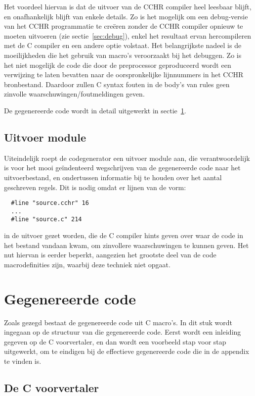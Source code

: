 Het voordeel hiervan is dat de uitvoer van de CCHR compiler heel leesbaar blijft, en onafhankelijk blijft van enkele details. Zo is het mogelijk om een debug-versie van het CCHR programmatie te cre\"eren zonder de CCHR compiler opnieuw te moeten uitvoeren (zie sectie~\ref{sec:debug}), enkel het resultaat ervan hercompileren met de C compiler en een andere optie volstaat. Het belangrijkste nadeel is de moeilijkheden die het gebruik van macro's veroorzaakt bij het debuggen. Zo is het niet mogelijk de code die door de preprocessor geproduceerd wordt een verwijzing te laten bevatten naar de oorspronkelijke lijnnummers in het CCHR bronbestand. Daardoor zullen C syntax fouten in de body's van rules geen zinvolle waarschuwingen/foutmeldingen geven.

De gegenereerde code wordt in detail uitgewerkt in sectie~\ref{sec:gencode}.

\subsection{Uitvoer module} \label{sec:uitvoer}

Uiteindelijk roept de codegenerator een uitvoer module aan, die verantwoordelijk is voor het mooi ge\"indenteerd wegschrijven van de gegenereerde code naar het uitvoerbestand, en ondertussen informatie bij te houden over het aantal geschreven regels. Dit is nodig omdat er lijnen van de vorm: \begin{Verbatim}
  #line "source.cchr" 16
  ...
  #line "source.c" 214
\end{Verbatim}
in de uitvoer gezet worden, die de C compiler hints geven over waar de code in het bestand vandaan kwam, om zinvollere waarschuwingen te kunnen geven. Het nut hiervan is eerder beperkt, aangezien het grootste deel van de code macrodefinities zijn, waarbij deze techniek niet opgaat.

\section{Gegenereerde code} \label{sec:gencode}

Zoals gezegd bestaat de gegenereerde code uit C macro's. In dit stuk wordt ingegaan op de structuur van die gegenereerde code. Eerst wordt een inleiding gegeven op de C voorvertaler, en dan wordt een voorbeeld stap voor stap uitgewerkt, om te eindigen bij de effectieve gegenereerde code die in de appendix te vinden is.

\subsection{De C voorvertaler} \label{sec:preproc}


